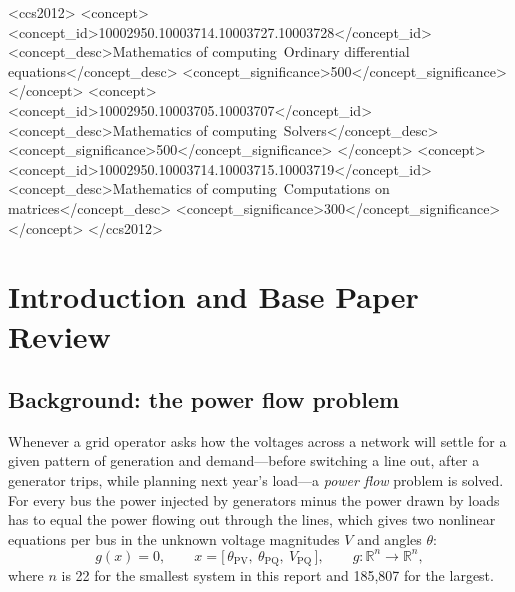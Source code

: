 \documentclass[sigconf,nonacm]{acmart}
\begin{document}
\begin{CCSXML}
<ccs2012>
   <concept>
       <concept_id>10002950.10003714.10003727.10003728</concept_id>
       <concept_desc>Mathematics of computing~Ordinary differential equations</concept_desc>
       <concept_significance>500</concept_significance>
   </concept>
   <concept>
       <concept_id>10002950.10003705.10003707</concept_id>
       <concept_desc>Mathematics of computing~Solvers</concept_desc>
       <concept_significance>500</concept_significance>
   </concept>
   <concept>
       <concept_id>10002950.10003714.10003715.10003719</concept_id>
       <concept_desc>Mathematics of computing~Computations on matrices</concept_desc>
       <concept_significance>300</concept_significance>
   </concept>
 </ccs2012>
\end{CCSXML}


\maketitle

\section{Introduction and Base Paper Review}\label{sec:intro}

\subsection{Background: the power flow problem}
Whenever a grid operator asks how the voltages across a network will settle for a given pattern of
generation and demand---before switching a line out, after a generator trips, while planning next
year's load---a \emph{power flow} problem is solved. For every bus the power injected by generators
minus the power drawn by loads has to equal the power flowing out through the lines, which gives two
nonlinear equations per bus in the unknown voltage magnitudes $V$ and angles $\theta$:
\begin{equation}
  g(x) = 0, \qquad x = \bigl[\,\theta_{\mathrm{PV}},\ \theta_{\mathrm{PQ}},\ V_{\mathrm{PQ}}\,\bigr],
  \qquad g:\mathbb{R}^n\to\mathbb{R}^n,
\end{equation}
where $n$ is 22 for the smallest system in this report and 185{,}807 for the largest.
\end{document}

